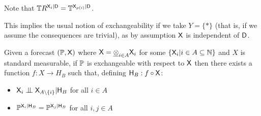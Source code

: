 Note that $\mathbb{T}R^{\mathsf{X}_i|\mathsf{D}} = \mathbb{T}^{\mathsf{X}_{\rho(i)}|\mathsf{D}}$.

This implies the usual notion of exchangeability if we take $Y=\{*\}$ (that is, if we assume the consequences are trivial), as by assumption $\mathsf{X}$ is independent of $\mathsf{D}$.


\begin{lemma}\label{lem:partial_representation}
Given a forecast $(\mathbb{P},\mathsf{X})$ where $\mathsf{X}=\underline{\otimes}_{i\in A} \mathsf{X}_i$ for some $\{\mathsf{X}_i|i\in A\subseteq\mathbb{N}\}$ and $X$ is standard measurable, if $\mathbb{P}$ is exchangeable with respect to $\mathsf{X}$ then there exists a function $f:X\to H_B$ such that, defining $\mathsf{H}_B:f\circ \mathsf{X}$:
    \begin{itemize}
        \item $\RV{X}_i\CI\RV{X}_{A\setminus\{i\}}|\RV{H}_B$ for all $i\in A$
        \item $\mathbb{P}^{\mathsf{X}_i|\mathsf{H}_B}=\mathbb{P}^{\mathsf{X}_j|\mathsf{H}_B}$ for all $i,j\in A$
    \end{itemize}
\end{lemma}

